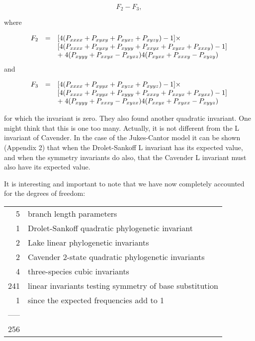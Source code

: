 \begin{equation} %
F_2 - F_3,
\end{equation}

where

\begin{equation}
\begin{array}{c c l}
F_2 & = & [4(P_{xxxx} + P_{xyxy} + P_{xyxz} + P_{xyzy}) - 1] \times \\
    &   &  [4(P_{xxxx} + P_{xyxy} + P_{xyyy} + P_{xxyx} + P_{xyxx} + P_{xxxy}) - 1]\\
    &   & +\; 4(P_{xyyy} + P_{xxyx} - P_{xyxz}) 4(P_{xyxx} + P_{xxxy} - P_{xyzy})
\end{array}
\end{equation}
and

\begin{equation}
\begin{array}{c c l}
F_{3} & = & [4(P_{xxxx} + P_{xyyx} + P_{xyzx} + P_{xyyz}) - 1] \times \\
      &   &  [4(P_{xxxx} + P_{xyyx} + P_{xyyy} + P_{xxxy} + P_{xxyx} + P_{xyxx}) - 1]\\
       &   &    +\; 4(P_{xyyy} + P_{xxxy} - P_{xyzx}) 4(P_{xxyx} + P_{xyxx} - P_{xyyz})
\end{array}
\end{equation}

for which the invariant is zero.  They also found another quadratic invariant.  
One might think that this is one too many.  Actually, it is not different from
the L invariant of Cavender.  In the case of the Jukes-Cantor model it can be
shown (Appendix 2) that when the Drolet-Sankoff L invariant has its expected
value, and when the symmetry invariants do also, that the Cavender L invariant
must also have its expected value.

It is interesting and important to note that
we have now completely accounted for the degrees of freedom:
\medskip

\begin{tabular}{r l}
              5  &   branch length parameters\\
              1  &   Drolet-Sankoff quadratic phylogenetic invariant\\
              2  &   Lake linear phylogenetic invariants \\
              2  &   Cavender 2-state quadratic phylogenetic invariants\\
              4  &   three-species cubic invariants\\
            241  &   linear invariants testing symmetry of base substitution\\
              1  &   since the expected frequencies add to 1\\
           ----- & \\
            256 &
\end{tabular}
\medskip


